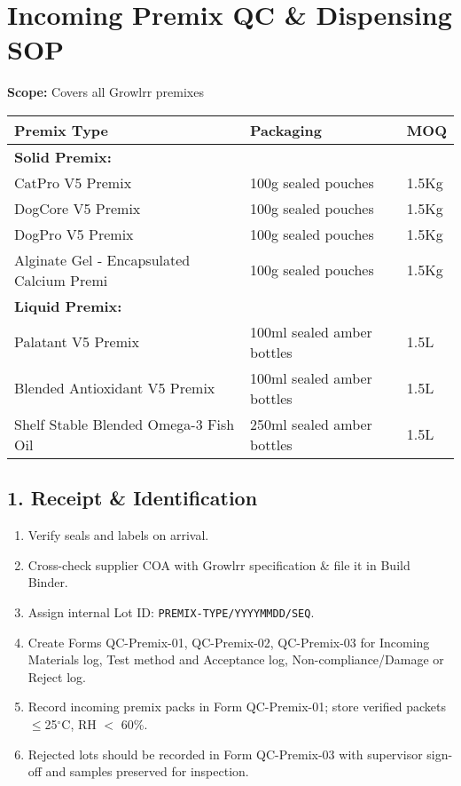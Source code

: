 
\section*{Incoming Premix QC \& Dispensing SOP}
\textbf{Scope:} Covers all Growlrr premixes

\begin{table}[h]
\centering
\begin{tabular}{lll}
\hline
\textbf{Premix Type} & \textbf{Packaging} & \textbf{MOQ} \\
\hline
\multicolumn{3}{l}{\textbf{Solid Premix:}} \\
CatPro V5 Premix & 100g sealed pouches & 1.5Kg \\
DogCore V5 Premix & 100g sealed pouches & 1.5Kg \\
DogPro V5 Premix & 100g sealed pouches & 1.5Kg \\
Alginate Gel - Encapsulated Calcium Premi & 100g sealed pouches & 1.5Kg \\
\hline
\multicolumn{3}{l}{\textbf{Liquid Premix:}} \\
Palatant V5 Premix & 100ml sealed amber bottles & 1.5L \\
Blended Antioxidant V5 Premix & 100ml sealed amber bottles & 1.5L \\
Shelf Stable Blended Omega-3 Fish Oil & 250ml sealed amber bottles & 1.5L \\
\hline
\end{tabular}
\end{table}

\subsection*{1. Receipt \& Identification}
\begin{enumerate}[leftmargin=*,noitemsep]
  \item Verify seals and labels on arrival.
  \item Cross-check supplier COA with Growlrr specification \& file it in Build Binder.
  \item Assign internal Lot ID: \texttt{PREMIX-TYPE/YYYYMMDD/SEQ}.
  \item Create Forms QC-Premix-01, QC-Premix-02, QC-Premix-03 for Incoming Materials log, Test method and Acceptance log, Non-compliance/Damage or Reject log.
  \item Record incoming premix packs in Form QC-Premix-01; store verified packets $\leq$25$^\circ$C, RH $<$ 60\%.
  \item Rejected lots should be recorded in Form QC-Premix-03 with supervisor sign-off and samples preserved for inspection. 
\end{enumerate}

